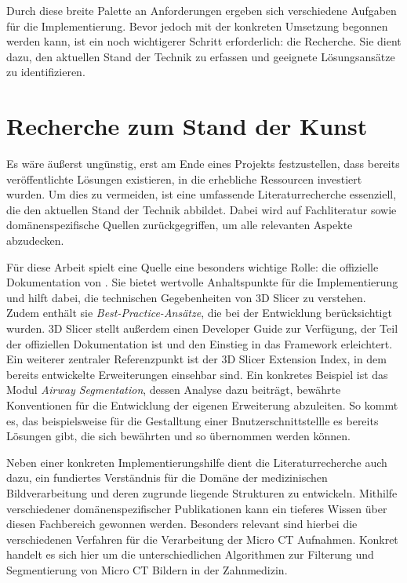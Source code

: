 Durch diese breite Palette an Anforderungen ergeben sich verschiedene Aufgaben für
die Implementierung. Bevor jedoch mit der konkreten Umsetzung begonnen werden
kann, ist ein noch wichtigerer Schritt erforderlich: die Recherche. Sie dient dazu,
den aktuellen Stand der Technik zu erfassen und geeignete Lösungsansätze zu
identifizieren.

\section{Recherche zum Stand der Kunst}
Es wäre äußerst ungünstig, erst am Ende eines Projekts festzustellen, dass
bereits veröffentlichte Lösungen existieren, in die erhebliche Ressourcen investiert
wurden. Um dies zu vermeiden, ist eine umfassende Literaturrecherche essenziell,
die den aktuellen Stand der Technik abbildet. Dabei wird auf Fachliteratur sowie
domänenspezifische Quellen zurückgegriffen, um alle relevanten Aspekte
abzudecken.

Für diese Arbeit spielt eine Quelle eine besonders wichtige Rolle: die offizielle
Dokumentation von \citet{slicer2024}. Sie bietet wertvolle Anhaltspunkte für die
Implementierung und hilft dabei, die technischen Gegebenheiten von 3D Slicer zu
verstehen. Zudem enthält sie \textit{Best-Practice-Ansätze}, die bei der Entwicklung
berücksichtigt wurden. 3D Slicer stellt außerdem einen Developer Guide zur
Verfügung, der Teil der offiziellen Dokumentation ist und den Einstieg in das Framework
erleichtert. Ein weiterer zentraler Referenzpunkt ist der 3D Slicer Extension
Index, in dem bereits entwickelte Erweiterungen einsehbar sind. Ein konkretes
Beispiel ist das Modul \textit{Airway Segmentation}, dessen Analyse dazu
beiträgt, bewährte Konventionen für die Entwicklung der eigenen Erweiterung abzuleiten.
So kommt es, das beispielsweise für die Gestalltung einer Bnutzerschnittstellle es
bereits Lösungen gibt, die sich bewährten und so übernommen werden können.

Neben einer konkreten Implementierungshilfe dient die Literaturrecherche auch
dazu, ein fundiertes Verständnis für die Domäne der medizinischen Bildverarbeitung
und deren zugrunde liegende Strukturen zu entwickeln. Mithilfe verschiedener
domänenspezifischer Publikationen kann ein tieferes Wissen über diesen
Fachbereich gewonnen werden. Besonders relevant sind hierbei die verschiedenen Verfahren
für die Verarbeitung der Micro CT Aufnahmen. Konkret handelt es sich hier um die
unterschiedlichen Algorithmen zur Filterung und Segmentierung von Micro CT
Bildern in der Zahnmedizin.


